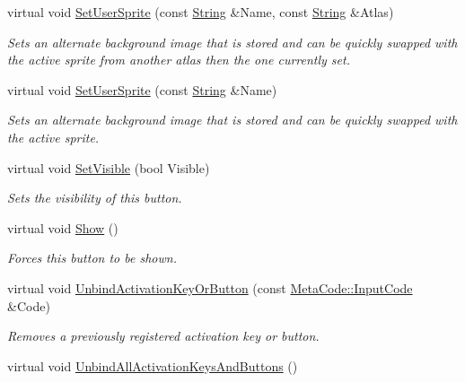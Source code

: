 \begin{DoxyCompactItemize}
virtual void \hyperlink{classMezzanine_1_1UI_1_1Button_ab4335cbb2c9da9b5b61d9ba53793efb6}{SetUserSprite} (const \hyperlink{namespaceMezzanine_acf9fcc130e6ebf08e3d8491aebcf1c86}{String} \&Name, const \hyperlink{namespaceMezzanine_acf9fcc130e6ebf08e3d8491aebcf1c86}{String} \&Atlas)
\begin{DoxyCompactList}\small\item\em Sets an alternate background image that is stored and can be quickly swapped with the active sprite from another atlas then the one currently set. \item\end{DoxyCompactList}\item 
virtual void \hyperlink{classMezzanine_1_1UI_1_1Button_a7e6246ca07c0c659a3aec7babd49219f}{SetUserSprite} (const \hyperlink{namespaceMezzanine_acf9fcc130e6ebf08e3d8491aebcf1c86}{String} \&Name)
\begin{DoxyCompactList}\small\item\em Sets an alternate background image that is stored and can be quickly swapped with the active sprite. \item\end{DoxyCompactList}\item 
virtual void \hyperlink{classMezzanine_1_1UI_1_1Button_a12840e06233a6feb88f61d88a0ce7e60}{SetVisible} (bool Visible)
\begin{DoxyCompactList}\small\item\em Sets the visibility of this button. \item\end{DoxyCompactList}\item 
\hypertarget{classMezzanine_1_1UI_1_1Button_a88d9f87d335041d612f6c35ff5ba2f65}{
virtual void \hyperlink{classMezzanine_1_1UI_1_1Button_a88d9f87d335041d612f6c35ff5ba2f65}{Show} ()}
\label{classMezzanine_1_1UI_1_1Button_a88d9f87d335041d612f6c35ff5ba2f65}

\begin{DoxyCompactList}\small\item\em Forces this button to be shown. \item\end{DoxyCompactList}\item 
virtual void \hyperlink{classMezzanine_1_1UI_1_1Button_ac4253cbf25d298280579fd2fe122b3e2}{UnbindActivationKeyOrButton} (const \hyperlink{classMezzanine_1_1MetaCode_a3b5633f0145bf3287cf53a3f05b5563c}{MetaCode::InputCode} \&Code)
\begin{DoxyCompactList}\small\item\em Removes a previously registered activation key or button. \item\end{DoxyCompactList}\item 
\hypertarget{classMezzanine_1_1UI_1_1Button_ae36443efdf271672157ae25a824d5cc5}{
virtual void \hyperlink{classMezzanine_1_1UI_1_1Button_ae36443efdf271672157ae25a824d5cc5}{UnbindAllActivationKeysAndButtons} ()}
\label{classMezzanine_1_1UI_1_1Button_ae36443efdf271672157ae25a824d5cc5}


\end{DoxyCompactItemize}
